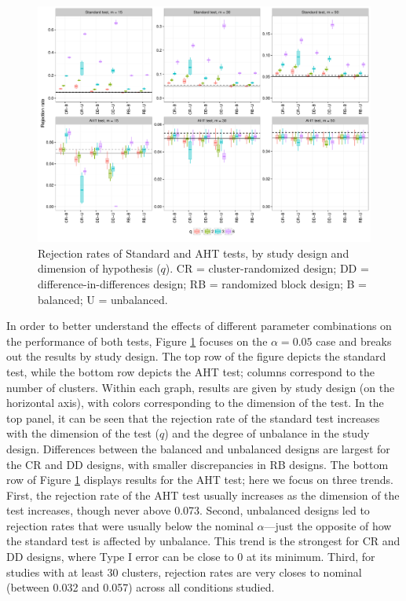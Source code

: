 \documentclass[12pt]{article}\usepackage[]{graphicx}\usepackage[]{color}
\newenvironment{knitrout}{}{} %
\begin{document}
\begin{knitrout}
\color{fgcolor}\begin{figure}

{\centering \includegraphics[width=\linewidth]{CR_fig/balance-1} 

}

\caption[Rejection rates of Standard and AHT tests, by study design and dimension of hypothesis (]{Rejection rates of Standard and AHT tests, by study design and dimension of hypothesis ($q$). CR = cluster-randomized design; DD = difference-in-differences design; RB = randomized block design; B = balanced; U = unbalanced.}\label{fig:balance}
\end{figure}


\end{knitrout}

In order to better understand the effects of different parameter combinations on the performance of both tests, Figure \ref{fig:balance} focuses on the $\alpha = 0.05$ case and breaks out the results by study design. The top row of the figure depicts the standard test, while the bottom row depicts the AHT test; columns correspond to the number of clusters.
Within each graph, results are given by study design (on the horizontal axis), with colors corresponding to the dimension of the test.
In the top panel, it can be seen that the rejection rate of the standard test increases with the dimension of the test ($q$) and the degree of unbalance in the study design.
Differences between the balanced and unbalanced designs are largest for the CR and DD designs, with smaller discrepancies in RB designs.
The bottom row of Figure \ref{fig:balance} displays results for the AHT test; here we focus on three trends.
First, the rejection rate of the AHT test usually increases as the dimension of the test increases, though never above 0.073.
Second, unbalanced designs led to rejection rates that were usually below the nominal $\alpha$---just the opposite of how the standard test is affected by unbalance. 
This trend is the strongest for CR and DD designs, where Type I error can be close to 0 at its minimum. 
Third, for studies with at least 30 clusters, rejection rates are very closes to nominal (between 0.032 and 0.057) across all conditions studied.
\end{document}
